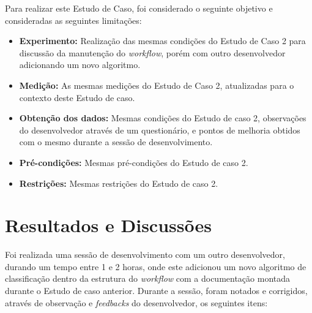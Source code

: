 \documentclass[portugues]{ic-tese}
\begin{document}
Para realizar este Estudo de Caso, foi considerado o seguinte objetivo e consideradas as seguintes limitações:

\begin{itemize}
\item \textbf{Experimento:} Realização das mesmas condições do Estudo de Caso 2 para discussão da manutenção do \textit{workflow}, porém com outro desenvolvedor adicionando um novo algoritmo.

\item \textbf{Medição:} As mesmas medições do Estudo de Caso 2, atualizadas para o contexto deste Estudo de caso.

\item \textbf{Obtenção dos dados:} Mesmas condições do Estudo de caso 2, observações do desenvolvedor através de um questionário, e pontos de melhoria obtidos com o mesmo durante a sessão de desenvolvimento.

\item \textbf{Pré-condições:} Mesmas pré-condições do Estudo de caso 2.

\item \textbf{Restrições:} Mesmas restrições do Estudo de caso 2.
\end{itemize}

\section{Resultados e Discussões}

Foi realizada uma sessão de desenvolvimento com um outro desenvolvedor, durando um tempo entre 1 e 2 horas, onde este adicionou um novo algoritmo de classificação dentro da estrutura do \textit{workflow} com a documentação montada durante o Estudo de caso anterior. Durante a sessão, foram notados e corrigidos, através de observação e \textit{feedbacks} do desenvolvedor, os seguintes itens:
\end{document}
